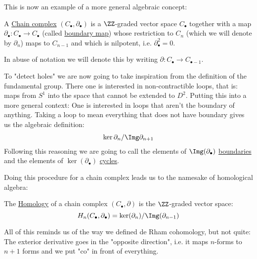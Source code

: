 This is now an example of a more general algebraic concept:

\begin{definition}
	A \underline{Chain complex} $(C_\bullet, \partial_\bullet)$ is a $\ZZ$-graded
	vector space $C_\bullet$ together with a map
	$\partial_\bullet: C_\bullet \to C_\bullet$ (called \underline{boundary map})
	whose restriction to $C_n$ (which we will denote by $\partial_n$) maps to
	$C_{n - 1}$ and which is nilpotent, i.e. $\partial_\bullet^2 = 0$.
\end{definition}
In abuse of notation we will denote this by writing
$\partial: C_\bullet \to C_{\bullet - 1}$.

To "detect holes" we are now going to take inspiration from the definition of
the fundamental group.
There one is interested in non-contractible loops, that
is: maps from $S^1$ into the space that cannot be extended to $D^2$. Putting
this into a more general context: One is interested in loops that aren't the boundary
of anything. Taking a loop to mean everything that does not have boundary gives us
the algebraic definition:
\begin{align*}
	\ker \partial_n / \Img \partial_{n + 1}
\end{align*}
Following this reasoning we are going to call the elements of $\Img(\partial_\bullet)$
\underline{boundaries} and the elements of $\ker(\partial_\bullet)$ \underline{cycles}.

Doing this procedure for a chain complex leads us to the namesake of homological algebra:
\begin{definition}
The \underline{Homology} of a chain complex $(C_\bullet, \partial)$ is the
$\ZZ$-graded vector space:
\[	
	H_n(C_\bullet, \partial_\bullet) = \ker(\partial_n)/\Img(\partial_{n - 1})
\]
\end{definition}

All of this reminds us of the way we defined de Rham cohomology, but not quite:
The exterior derivative goes in the "opposite direction", i.e. it maps $n$-forms
to $n+1$ forms and we put "co" in front of everything.


